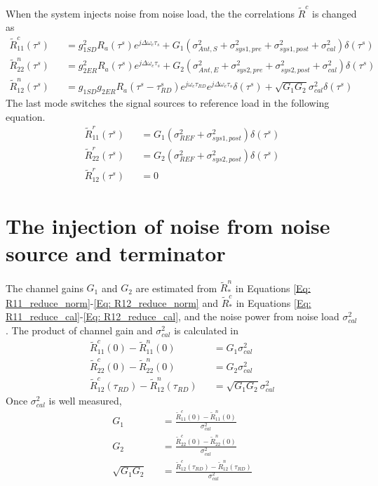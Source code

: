 \documentclass[draftcls,onecolumn]{IEEEtran}  %
\begin{document}
When the system injects noise from noise load, the the correlations $\tilde{R}^c$ is changed as
\begin{eqnarray}
	\tilde{R}_{11}^c(\tau^s) &&= g^2_{1SD} R_a(\tau^s)e^{j\Delta\omega_e\tau_s}+
G_1(\sigma^2_{Ant,S}+\sigma^2_{sys1,pre} +\sigma^2_{sys1,post}+\sigma^2_{cal}) \delta(\tau^s)                                      
\label{Eq: R11_reduce_cal} \\
	\tilde{R}_{22}^n(\tau^s) &&= g^2_{2ER} R_a(\tau^s)e^{j\Delta\omega_e\tau_s}+
G_2(\sigma^2_{Ant,E}+\sigma^2_{sys2,pre} +\sigma^2_{sys2,post}+\sigma^2_{cal}) \delta(\tau^s)                                       
\label{Eq: R22_reduce_cal} \\
	\tilde{R}_{12}^n(\tau^s) &&= g_{1SD} g_{2ER} R_a(\tau^s-\tau^s_{RD})e^{j\omega_e \tau_{RD}} e^{j\Delta\omega_e\tau_s}\delta(\tau^s)+
    \sqrt{G_1 G_2}\sigma^2_{cal}\delta(\tau^s)  
\label{Eq: R12_reduce_cal}
\end{eqnarray}The last mode switches the signal sources to reference load in the following equation.
\begin{eqnarray}
	\tilde{R}_{11}^r(\tau^s) &&= G_1(\sigma^2_{REF}+\sigma^2_{sys1,post}) \delta(\tau^s)                                      
\label{Eq: R11_reduce_ref} \\
	\tilde{R}_{22}^r(\tau^s) &&= G_2(\sigma^2_{REF}+\sigma^2_{sys2,post}) \delta(\tau^s)                                
\label{Eq: R22_reduce_ref} \\
	\tilde{R}_{12}^r(\tau^s) &&= 0 
\label{Eq: R12_reduce_ref}
\end{eqnarray}
\section{The injection of noise from noise source and terminator}
The channel gains $G_1$ and $G_2$ are estimated from  $\tilde{R}^n_*$ in Equations \ref{Eq: R11_reduce_norm}-\ref{Eq: R12_reduce_norm} and $\tilde{R}^c_*$ in Equations \ref{Eq: R11_reduce_cal}-\ref{Eq: R12_reduce_cal}, and the noise power from noise load $\sigma^2_{cal}$. The product of channel gain and $\sigma^2_{cal}$ is calculated in
\begin{eqnarray}
	\tilde{R}^c_{11}(0) - \tilde{R}^n_{11}(0)&&= G_1\sigma^2_{cal} \label{Eq: Cal_channel_gain1a} \\
    \tilde{R}^c_{22}(0) - \tilde{R}^n_{22}(0)&&= G_2\sigma^2_{cal} \label{Eq: Cal_channel_gain2a} \\
    \tilde{R}^c_{12}(\tau_{RD}) - \tilde{R}^n_{12}(\tau_{RD})&&= \sqrt{G_1 G_2}\sigma^2_{cal} \label{Eq: Cal_channel_gain12a}
\end{eqnarray}
Once $\sigma^2_{cal}$ is well measured, 
\begin{eqnarray}
	G_1 &&= \frac{\tilde{R}^c_{11}(0) - \tilde{R}^n_{11}(0)}{\sigma^2_{cal}}  \label{Eq: Cal_channel_gain1} \\
    G_2 &&= \frac{\tilde{R}^c_{22}(0) - \tilde{R}^n_{22}(0)}{\sigma^2_{cal}}  \label{Eq: Cal_channel_gain2} \\
    \sqrt{G_1 G_2} &&= \frac{\tilde{R}^c_{12}(\tau_{RD}) - \tilde{R}^n_{12}(\tau_{RD})}{\sigma^2_{cal}}  \label{Eq: Cal_channel_gain12}
\end{eqnarray}
\end{document}
